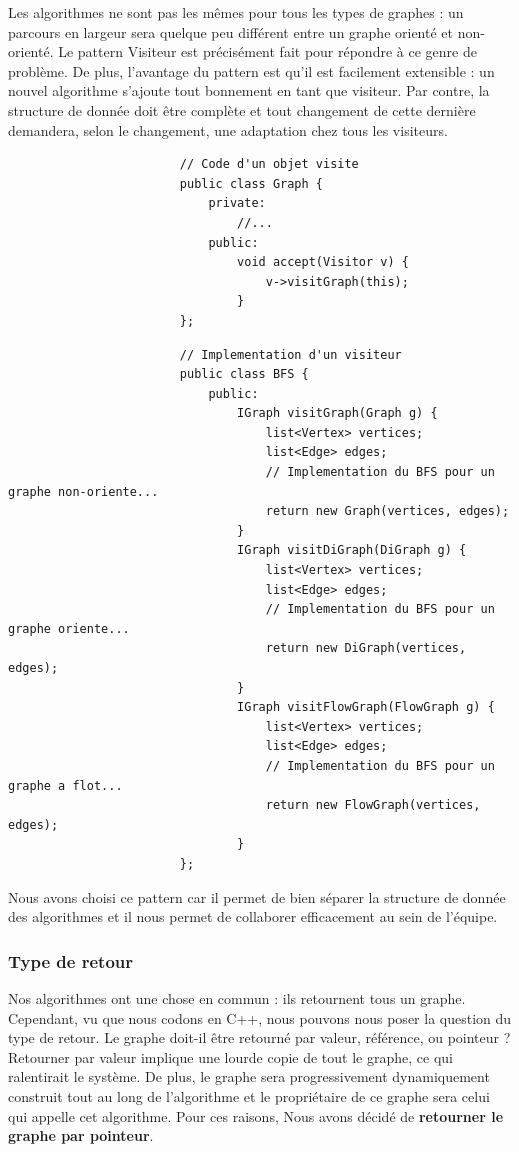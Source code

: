 \documentclass[french]{article}
\begin{document}
			Les algorithmes ne sont pas les mêmes pour tous les types de graphes : un parcours en largeur sera quelque peu différent entre un graphe orienté et non-orienté. Le pattern Visiteur est précisément fait pour répondre à ce genre de problème. De plus, l'avantage du pattern est qu'il est facilement extensible : un nouvel algorithme s'ajoute tout bonnement en tant que visiteur. Par contre, la structure de donnée doit être complète et tout changement de cette dernière demandera, selon le changement, une adaptation chez tous les visiteurs.\\
			
			\begin{lstlisting}
						// Code d'un objet visite
						public class Graph {
							private:
								//...
							public:
								void accept(Visitor v) {
									v->visitGraph(this);
								}
						};
			\end{lstlisting}
			\begin{lstlisting}
						// Implementation d'un visiteur
						public class BFS {
							public:
								IGraph visitGraph(Graph g) {
									list<Vertex> vertices;
									list<Edge> edges;
									// Implementation du BFS pour un graphe non-oriente...
									return new Graph(vertices, edges);
								}
								IGraph visitDiGraph(DiGraph g) {
									list<Vertex> vertices;
									list<Edge> edges;
									// Implementation du BFS pour un graphe oriente...
									return new DiGraph(vertices, edges);
								}
								IGraph visitFlowGraph(FlowGraph g) {
									list<Vertex> vertices;
									list<Edge> edges;
									// Implementation du BFS pour un graphe a flot...
									return new FlowGraph(vertices, edges);
								}
						};
			\end{lstlisting}
			
			Nous avons choisi ce pattern car il permet de bien séparer la structure de donnée des algorithmes et il nous permet de collaborer efficacement au sein de l'équipe.
			
			\subsubsection{Type de retour}
			Nos algorithmes ont une chose en commun : ils retournent tous un graphe. Cependant, vu que nous codons en C++, nous pouvons nous poser la question du type de retour. Le graphe doit-il être retourné par valeur, référence, ou pointeur ?\\
			Retourner par valeur implique une lourde copie de tout le graphe, ce qui ralentirait le système. De plus, le graphe sera progressivement dynamiquement construit tout au long de l'algorithme et le propriétaire de ce graphe sera celui qui appelle cet algorithme. Pour ces raisons, Nous avons décidé de \textbf{retourner le graphe par pointeur}.
	
\end{document}
